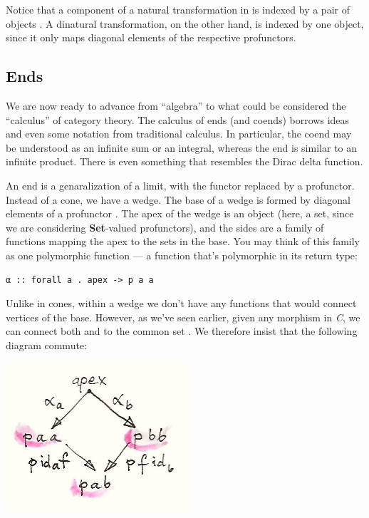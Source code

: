 Notice that a component of a natural transformation  in
 is indexed by a pair of objects
. A dinatural transformation, on the other hand, is
indexed by one object, since it only maps diagonal elements of the
respective profunctors.

\subsection{Ends}\label{ends}

We are now ready to advance from ``algebra'' to what could be considered
the ``calculus'' of category theory. The calculus of ends (and coends)
borrows ideas and even some notation from traditional calculus. In
particular, the coend may be understood as an infinite sum or an
integral, whereas the end is similar to an infinite product. There is
even something that resembles the Dirac delta function.

An end is a genaralization of a limit, with the functor replaced by a
profunctor. Instead of a cone, we have a wedge. The base of a wedge is
formed by diagonal elements of a profunctor . The apex of the
wedge is an object (here, a set, since we are considering
\textbf{Set}-valued profunctors), and the sides are a family of
functions mapping the apex to the sets in the base. You may think of
this family as one polymorphic function --- a function that's
polymorphic in its return type:

\begin{verbatim}
α :: forall a . apex -> p a a
\end{verbatim}

Unlike in cones, within a wedge we don't have any functions that would
connect vertices of the base. However, as we've seen earlier, given any
morphism  in \emph{C}, we can connect both
 and  to the common set
. We therefore insist that the following diagram
commute:

\includegraphics[width=2.69792in]{images/end-2.jpg}

